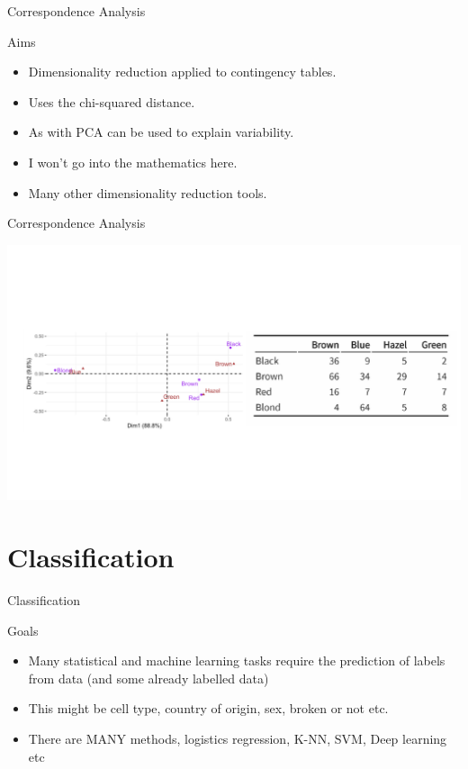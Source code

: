 \documentclass{bredelebeamer}
\begin{document}
\begin{frame}{Correspondence Analysis}

\begin{exampleblock}{Aims}
	
	\begin{itemize}
\item Dimensionality reduction applied to contingency tables.
\item Uses the chi-squared distance.
\item As with PCA can be used to explain variability.
\item I won't go into the mathematics here.
\item Many other dimensionality reduction tools.
\end{itemize}
\end{exampleblock}
\end{frame}

\begin{frame}{Correspondence Analysis}

\includegraphics[width = 1\textwidth]{corranalysis}
\end{frame}

\section{Classification}


\begin{frame}{Classification}

\begin{exampleblock}{Goals}
	
\begin{itemize}
	
\item Many statistical and machine learning tasks require the prediction of labels from data (and some already labelled data)
\item This might be cell type, country of origin, sex, broken or not etc.
\item There are MANY methods, logistics regression, K-NN, SVM, Deep learning etc
\end{itemize}

\end{exampleblock}

\end{frame}
\end{document}
